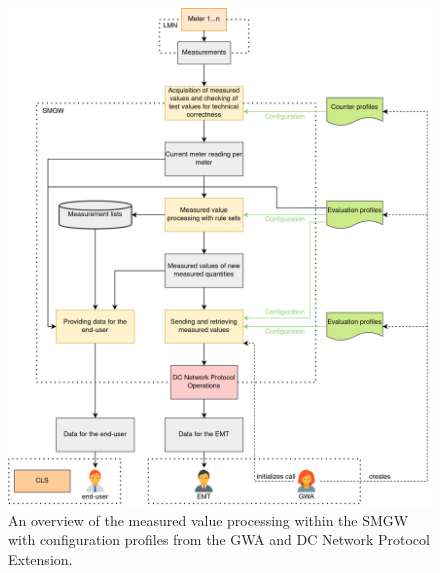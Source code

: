 
\chapter{}
\label{sec:Appendix}
\begin{figure}[H]
  \centering
  \includegraphics[width=1\textwidth]{images/Messverarbeitung_mit_DC_Eng2.png}
  \caption[Measured Value Processing in a SMGW]{An overview of the measured value processing within the SMGW with configuration profiles from the GWA and DC Network Protocol Extension.}
  \label{fig:value_processing_with_dc}
\end{figure}
